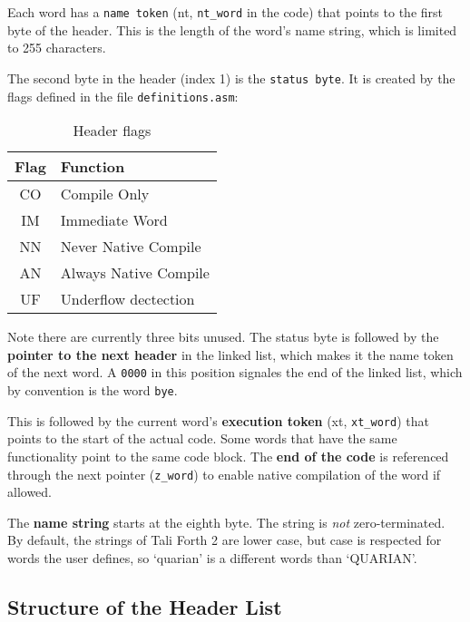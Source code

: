 Each word has a \texttt{name token} (nt, \texttt{nt\_word} in the code) that
points to the first byte of the header. This is the length of the word's name
string, which is limited to 255 characters. 

The second byte in the header (index 1) is the \texttt{status byte}. It is created by
the flags defined in the file \texttt{definitions.asm}: 

\begin{table}[h!]
        \label{tab:table_flags}
        \centering
\begin{tabular}{ | c | l | }
        \hline
        Flag & Function\\
        \hline
        CO & Compile Only\\
        IM & Immediate Word\\
        NN & Never Native Compile\\
        AN & Always Native Compile\\
        UF & Underflow dectection\\
        \hline
\end{tabular}
        \caption{Header flags}
\end{table}

Note there are currently three bits unused. The status byte
is followed by the \textbf{pointer to the next header} in the linked list, which
makes it the name token of the next word. A \texttt{0000} in
this position signales the end of the linked list, which by convention is the
word \texttt{bye}. 

This is followed by the current word's \textbf{execution token} (xt,
\texttt{xt\_word}) that points to the start of the actual code. Some words that
have the same functionality point to the same code block. The \textbf{end of the
code} is referenced through the next pointer (\texttt{z\_word}) to enable native
compilation of the word if allowed. 

The \textbf{name string} starts at the eighth byte. The string is \textit{not}
zero-terminated. By default, the strings of Tali Forth 2 are lower
case, but case is respected for words the user defines, so
`quarian' is a different words than `QUARIAN'. 


\subsection{Structure of the Header List}

